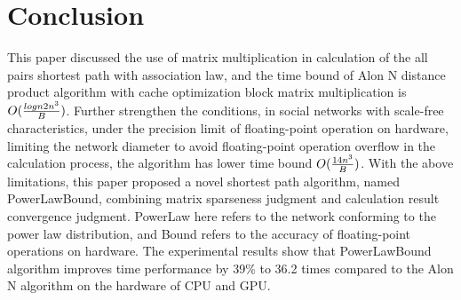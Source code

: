 \documentclass[review]{cvpr}
\begin{document}
\section{Conclusion}
This paper discussed the use of matrix multiplication in calculation of the all pairs shortest path with association law, and the time bound of Alon N distance product algorithm with cache optimization block matrix multiplication is \(O({logn2n^3 \over B})\).
Further strengthen the conditions, in social networks with scale-free characteristics, under the precision limit of floating-point operation on hardware, limiting the network diameter to avoid floating-point operation overflow in the calculation process,
the algorithm has lower time bound \(O({14n^3 \over B})\). With the above limitations, this paper proposed a novel shortest path algorithm, named PowerLawBound, combining matrix sparseness judgment and calculation result convergence judgment.
PowerLaw here refers to the network conforming to the power law distribution, and Bound refers to the accuracy of floating-point operations on hardware.
The experimental results show that PowerLawBound algorithm improves time performance by 39\% to 36.2 times compared to the Alon N algorithm on the hardware of CPU and GPU.
\end{document}
